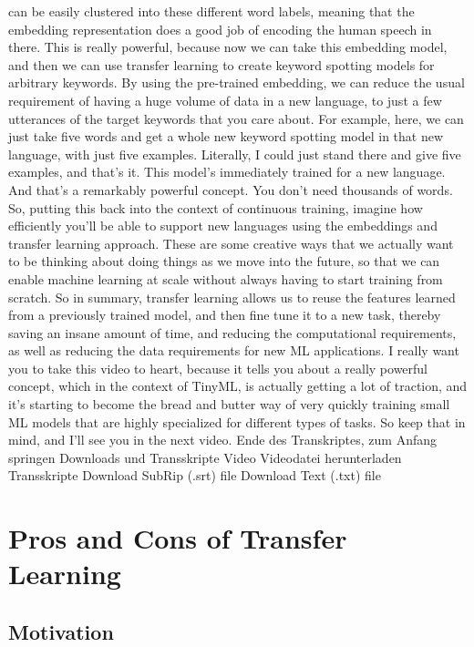 {{{{    can be easily clustered into these different word labels,
    meaning that the embedding representation does
    a good job of encoding the human speech in there.
    This is really powerful, because now we can take this embedding model,
    and then we can use transfer learning to create keyword spotting models
    for arbitrary keywords.
    By using the pre-trained embedding, we can reduce the usual requirement
    of having a huge volume of data in a new language,
    to just a few utterances of the target keywords that you care about.
    For example, here, we can just take five words
    and get a whole new keyword spotting model in that new language,
    with just five examples.
    Literally, I could just stand there and give five examples, and that's it.
    This model's immediately trained for a new language.
    And that's a remarkably powerful concept.
    You don't need thousands of words.
    So, putting this back into the context of continuous training,
    imagine how efficiently you'll be able to support
    new languages using the embeddings and transfer learning approach.
    These are some creative ways that we actually
    want to be thinking about doing things as we move into the future,
    so that we can enable machine learning at scale without always
    having to start training from scratch.
    So in summary, transfer learning allows us
    to reuse the features learned from a previously trained model,
    and then fine tune it to a new task, thereby saving
    an insane amount of time, and reducing the computational requirements,
    as well as reducing the data requirements for new ML applications.
    I really want you to take this video to heart,
    because it tells you about a really powerful concept, which
    in the context of TinyML, is actually getting a lot of traction,
    and it's starting to become the bread and butter way of very quickly training
    small ML models that are highly specialized for different types
    of tasks.
    So keep that in mind, and I'll see you in the next video.
    Ende des Transkriptes, zum Anfang springen
    Downloads und Transskripte
    Video
    Videodatei herunterladen
    Transskripte
    Download SubRip (.srt) file
    Download Text (.txt) file

\section{Pros and Cons of Transfer Learning}


    
    \subsection{Motivation}
    
}}}}

